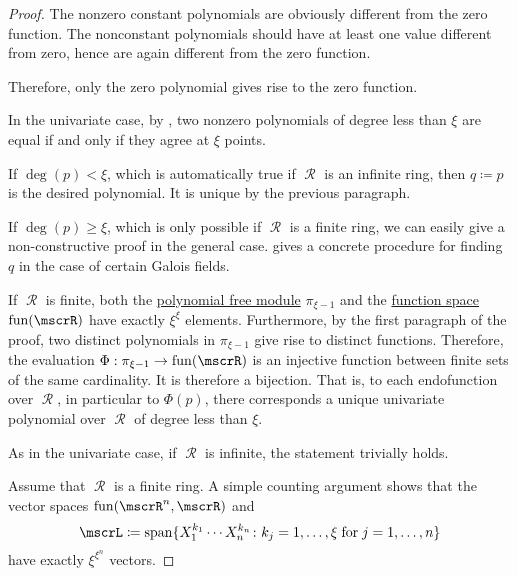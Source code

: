 \begin{proof}
   The nonzero constant polynomials are obviously different from the zero function. The nonconstant polynomials should have at least one value different from zero, hence are again different from the zero function.

  Therefore, only the zero polynomial gives rise to the zero function.

   In the univariate case, by , two nonzero polynomials of degree less than \( \xi \) are equal if and only if they agree at \( \xi \) points.

  If \( \deg(p) < \xi \), which is automatically true if \( \mscrR \) is an infinite ring, then \( q \coloneqq p \) is the desired polynomial. It is unique by the previous paragraph.

  If \( \deg(p) \geq \xi \), which is only possible if \( \mscrR \) is a finite ring, we can easily give a non-constructive proof in the general case.  gives a concrete procedure for finding \( q \) in the case of certain Galois fields.

  If \( \mscrR \) is finite, both the \hyperref[def:polynomial_free_module]{polynomial free module} \( \pi_{\xi - 1} \) and the \hyperref[thm:functions_over_ring_form_algebra]{function space} \( \fun(\mscrR) \) have exactly \( \xi^\xi \) elements. Furthermore, by the first paragraph of the proof, two distinct polynomials in \( \pi_{\xi - 1} \) give rise to distinct functions. Therefore, the evaluation \( \Phi: \pi_{\xi - 1} \to \fun(\mscrR) \) is an injective function between finite sets of the same cardinality. It is therefore a bijection. That is, to each endofunction over \( \mscrR \), in particular to \( \Phi(p) \), there corresponds a unique univariate polynomial over \( \mscrR \) of degree less than \( \xi \).

   As in the univariate case, if \( \mscrR \) is infinite, the statement trivially holds.

  Assume that \( \mscrR \) is a finite ring. A simple counting argument shows that the vector spaces \( \fun(\mscrR^n, \mscrR) \) and
  \begin{equation*}
    \mscrL \coloneqq \linspan \{ X_1^{k_1} \cdots X_n^{k_n} \colon k_j = 1, \ldots, \xi \T{for} j = 1, \ldots, n \}
  \end{equation*}
  have exactly \( \xi^{\xi^n} \) vectors.


\end{proof}
